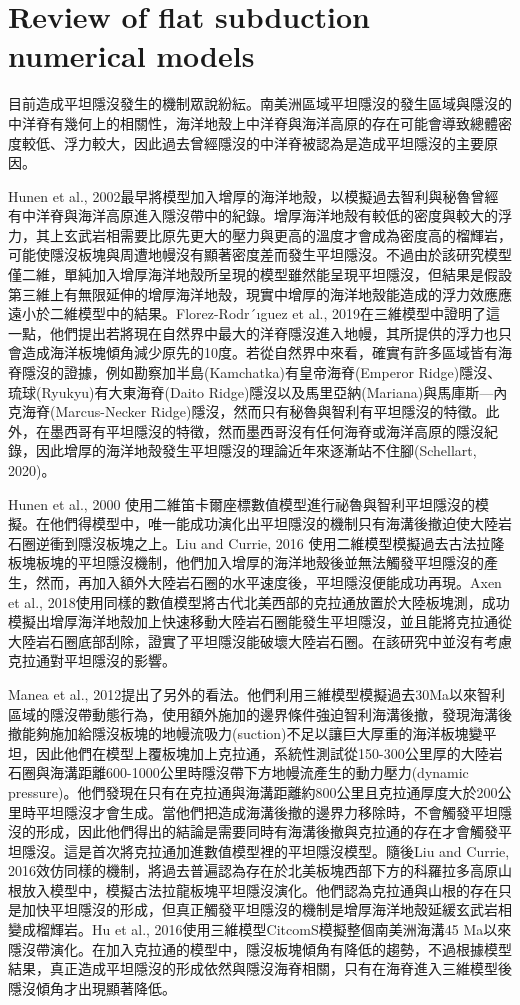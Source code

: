 \section{Review of flat subduction numerical models}

目前造成平坦隱沒發生的機制眾說紛紜。南美洲區域平坦隱沒的發生區域與隱沒的中洋脊有幾何上的相關性，海洋地殼上中洋脊與海洋高原的存在可能會導致總體密度較低、浮力較大，因此過去曾經隱沒的中洋脊被認為是造成平坦隱沒的主要原因。

Hunen et al., 2002最早將模型加入增厚的海洋地殼，以模擬過去智利與秘魯曾經有中洋脊與海洋高原進入隱沒帶中的紀錄。增厚海洋地殼有較低的密度與較大的浮力，其上玄武岩相需要比原先更大的壓力與更高的溫度才會成為密度高的榴輝岩，可能使隱沒板塊與周遭地幔沒有顯著密度差而發生平坦隱沒。不過由於該研究模型僅二維，單純加入增厚海洋地殼所呈現的模型雖然能呈現平坦隱沒，但結果是假設第三維上有無限延伸的增厚海洋地殼，現實中增厚的海洋地殼能造成的浮力效應應遠小於二維模型中的結果。Florez-Rodr´ıguez et al., 2019在三維模型中證明了這一點，他們提出若將現在自然界中最大的洋脊隱沒進入地幔，其所提供的浮力也只會造成海洋板塊傾角減少原先的10度。若從自然界中來看，確實有許多區域皆有海脊隱沒的證據，例如勘察加半島(Kamchatka)有皇帝海脊(Emperor Ridge)隱沒、琉球(Ryukyu)有大東海脊(Daito Ridge)隱沒以及馬里亞納(Mariana)與馬庫斯—內克海脊(Marcus-Necker Ridge)隱沒，然而只有秘魯與智利有平坦隱沒的特徵。此外，在墨西哥有平坦隱沒的特徵，然而墨西哥沒有任何海脊或海洋高原的隱沒紀錄，因此增厚的海洋地殼發生平坦隱沒的理論近年來逐漸站不住腳(Schellart, 2020)。

Hunen et al., 2000 使用二維笛卡爾座標數值模型進行祕魯與智利平坦隱沒的模擬。在他們得模型中，唯一能成功演化出平坦隱沒的機制只有海溝後撤迫使大陸岩石圈逆衝到隱沒板塊之上。Liu and Currie, 2016 使用二維模型模擬過去古法拉隆板塊板塊的平坦隱沒機制，他們加入增厚的海洋地殼後並無法觸發平坦隱沒的產生，然而，再加入額外大陸岩石圈的水平速度後，平坦隱沒便能成功再現。Axen et al., 2018使用同樣的數值模型將古代北美西部的克拉通放置於大陸板塊測，成功模擬出增厚海洋地殼加上快速移動大陸岩石圈能發生平坦隱沒，並且能將克拉通從大陸岩石圈底部刮除，證實了平坦隱沒能破壞大陸岩石圈。在該研究中並沒有考慮克拉通對平坦隱沒的影響。

Manea et al., 2012提出了另外的看法。他們利用三維模型模擬過去30Ma以來智利區域的隱沒帶動態行為，使用額外施加的邊界條件強迫智利海溝後撤，發現海溝後撤能夠施加給隱沒板塊的地幔流吸力(suction)不足以讓巨大厚重的海洋板塊變平坦，因此他們在模型上覆板塊加上克拉通，系統性測試從150-300公里厚的大陸岩石圈與海溝距離600-1000公里時隱沒帶下方地幔流產生的動力壓力(dynamic pressure)。他們發現在只有在克拉通與海溝距離約800公里且克拉通厚度大於200公里時平坦隱沒才會生成。當他們把造成海溝後撤的邊界力移除時，不會觸發平坦隱沒的形成，因此他們得出的結論是需要同時有海溝後撤與克拉通的存在才會觸發平坦隱沒。這是首次將克拉通加進數值模型裡的平坦隱沒模型。隨後Liu and Currie, 2016效仿同樣的機制，將過去普遍認為存在於北美板塊西部下方的科羅拉多高原山根放入模型中，模擬古法拉龍板塊平坦隱沒演化。他們認為克拉通與山根的存在只是加快平坦隱沒的形成，但真正觸發平坦隱沒的機制是增厚海洋地殼延緩玄武岩相變成榴輝岩。Hu et al., 2016使用三維模型CitcomS模擬整個南美洲海溝45 Ma以來隱沒帶演化。在加入克拉通的模型中，隱沒板塊傾角有降低的趨勢，不過根據模型結果，真正造成平坦隱沒的形成依然與隱沒海脊相關，只有在海脊進入三維模型後隱沒傾角才出現顯著降低。

